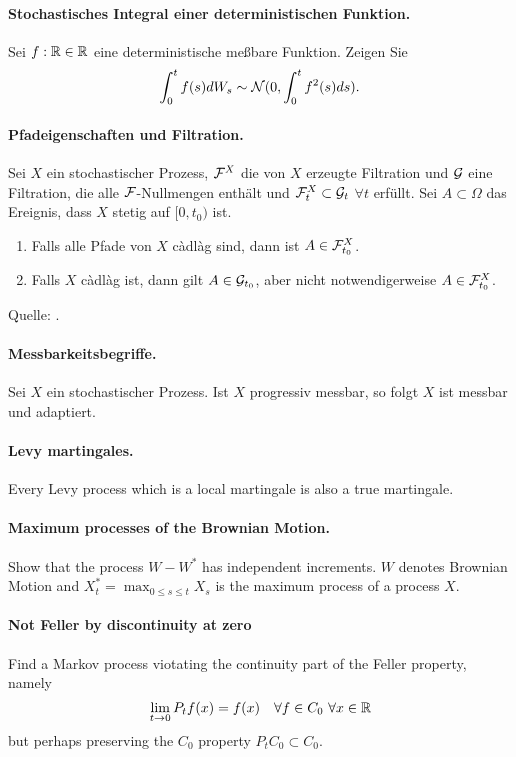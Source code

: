 

\paragraph{Stochastisches Integral einer deterministischen Funktion. } Sei
$f: \mathbb R\in\mathbb R$ eine deterministische meßbare Funktion. Zeigen Sie 
\begin{equation}
    \int_{0}^{t} f(s) d W_s \sim \mathcal N(0, \int_{0}^{t} f^2(s) ds). 
\end{equation}


\paragraph{Pfadeigenschaften und Filtration. }  Sei $X$ ein stochastischer
Prozess, $\mathcal F^{X}$ die von $X$ erzeugte Filtration und $\mathcal G$ eine Filtration,
die alle $\mathcal F$-Nullmengen enthält und $\mathcal F^{X}_t \subset \mathcal G_t$ $\forall t$
erfüllt.  Sei $A \subset \Omega$ das Ereignis, dass $X$ stetig auf $[0, t_0)$
ist. 
\begin{enumerate}
    \item Falls alle Pfade von $X$ c\`adl\`ag sind, dann ist $A \in \mathcal F^{X}_{t_0}$.
    \item Falls $X$ c\`adl\`ag ist, dann gilt $A \in \mathcal G_{t_0}$, aber nicht
        notwendigerweise $A \in \mathcal F^{X}_{t_0}$.
\end{enumerate}
Quelle: \cite{Karatzas1991}.


\paragraph{Messbarkeitsbegriffe. } Sei $X$ ein stochastischer Prozess. Ist $X$
progressiv messbar, so folgt $X$ ist messbar und adaptiert.


\paragraph{Levy martingales.} Every Levy process which is a local martingale is
also a true martingale.


\paragraph{Maximum processes of the Brownian Motion. } Show that the process $W
- W^*$ has independent increments. $W$ denotes Brownian Motion and $X^*_t=
\max_{0 \leq s \leq t} X_s$ is the maximum process of a \cadlag process $X$.


\paragraph{Not Feller by discontinuity at zero}
Find a Markov process viotating the continuity part of 
the Feller property, namely
\begin{equation}
\lim_{t\to 0} P_t f(x) = f(x) \quad \forall f \in C_0 \ \forall x\in \mathbb R
\end{equation}
but perhaps preserving the $C_0$ property $P_t C_0 \subset C_0$.




